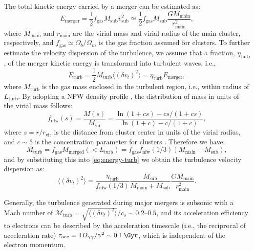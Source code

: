 \documentclass[modern]{aastex61}
\newcommand{\R}[1]{\mathrm{#1}}
\begin{document}
The total kinetic energy carried by a merger can be estimated as:
\begin{equation}
  \label{eq:energy-merger}
  E_{\R{merger}} = \frac{1}{2} f_{\R{gas}} M_{\R{sub}} v^2_{\R{sub}}
    \simeq \frac{1}{2} f_{\R{gas}} M_{\R{sub}} \frac{G M_{\R{main}}}{r^2_{\R{main}}},
\end{equation}
where $M_{\R{main}}$ and $r_{\R{main}}$ are the virial mass and virial
radius of the main cluster, respectively,
and $f_{\R{gas}} \simeq \Omega_b/\Omega_m$ is the gas fraction assumed
for clusters.
To further estimate the velocity dispersion of the turbulence, we assume
that a fraction, $\eta_{\R{turb}}$, of the merger kinetic energy is
transformed into turbulent waves, i.e.,
\begin{equation}
  \label{eq:energy-turb}
  E_{\R{turb}} = \frac{1}{2} M_{\R{turb}} \langle (\delta{v_t})^2 \rangle
    = \eta_{\R{turb}} E_{\R{merger}},
\end{equation}
where
$M_{\R{turb}}$ is the gas mass enclosed in the turbulent region, i.e.,
within radius of $L_{\R{turb}}$.
By adopting a NFW density profile \citep{navarro1997}, the distribution
of mass in units of the virial mass follows:
\begin{equation}
  \label{eq:mass-dist-nfw}
  f_{\R{nfw}}(s) = \frac{M(s)}{M_{\R{vir}}} =
    \frac{\ln(1 + c s) - c s / (1 + c s)}{\ln(1 + c) - c / (1 + c)},
\end{equation}
where $s = r / r_{\R{vir}}$ is the distance from cluster center in units
of the virial radius, and $c \sim 5$ is the concentration parameter for
clusters \citep{lokas2001}.
Therefore we have:
\begin{equation}
  \label{eq:mass-turb}
  M_{\R{turb}} = f_{\R{gas}} M_{\R{merged}}(<L_{\R{turb}})
    = f_{\R{gas}} f_{\R{nfw}}(1/3) (M_{\R{main}} + M_{\R{sub}}),
\end{equation}
and by substituting this into \autoref{eq:energy-turb} we obtain
the turbulence velocity dispersion as:
\begin{equation}
  \label{eq:turb-velocity-dispersion}
  \langle (\delta{v_t})^2 \rangle =
    \frac{\eta_{\R{turb}}}{f_{\R{nfw}}(1/3)}
    \frac{M_{\R{sub}}}{M_{\R{main}} + M_{\R{sub}}}
    \frac{G M_{\R{main}}}{r^2_{\R{main}}}.
\end{equation}

Generally, the turbulence generated during major mergers is subsonic
with a Mach number of
$\mathcal{M}_{\R{turb}} = \sqrt{\langle (\delta{v_t})^2 \rangle} / c_s \sim \numrange{0.2}{0.5}$,
and its acceleration efficiency to electrons can be described by the
acceleration timescale (i.e., the reciprocal of acceleration rate)
$\tau_{\R{acc}} = 4 D_{\gamma\gamma} / \gamma^2 \sim \SI{0.1}{\Gyr}$,
which is independent of the electron momentum.
\end{document}
